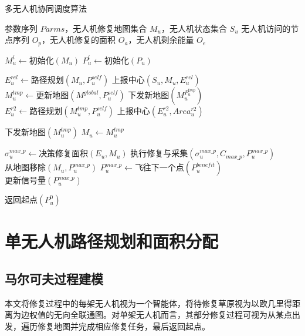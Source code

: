 \documentclass[AutoFakeBold]{LZUThesis}
\begin{document}
\begin{algorithm}[H]
	\caption{多无人机协同调度算法}
	\label{alg:multi_uav_scheduling}
	\begin{algorithmic}[1]
		\Require 参数序列 $Parms$，无人机修复地图集合 $M_u$，无人机状态集合 $S_u$
		\Ensure 无人机访问的节点序列 $O_p$，无人机修复的面积 $O_a$，无人机剩余能量 $O_e$

		\State $M_u^i \gets \text{初始化}(M_u)$ 
		\State $P_u^i \gets \text{初始化}(P_u)$ 

		\State $E_u^{rel} \gets \text{路径规划}(M_u, P_u^{self})$ 
		\State $\text{上报中心}(S_u, M_u, E_u^{rel})$ 
		\State $M_u^{tmp} \gets \text{更新地图}(M^{global}, P_u^{self})$ 
		\State $\text{下发新地图}(M_u^{P_u^{tmp}})$ 
		\State $E_u^{r2} \gets \text{路径规划}(M_u^{tmp}, P_u^{self})$ 
		\State $\text{上报中心}(E_u^{r2}, Area_u^{r2})$ 

		\State $\text{下发新地图}(M_u^{tmp})$ 
		\State $M_u \gets M_u^{tmp}$
		\EndIf

		\State $\sigma_u^{max\_p} \gets \text{决策修复面积}(E_u, M_u)$ 
		\State $\text{执行修复与采集}(\sigma_u^{max\_p}, C_{max\_p}, P_u^{max\_p})$ 
		\State $\text{从地图移除}(M_u, P_u^{max\_p})$
		\State $P_u^{max\_p} \gets \text{飞往下一个点}(P_u^{benefit})$ 
		\State $\text{更新信号量}(P_u^{max\_p})$ 
		\EndWhile

		\State $\text{返回起点}(P_u^0)$ 
	\end{algorithmic}
\end{algorithm}


\section{单无人机路径规划和面积分配}

\subsection{马尔可夫过程建模}
本文将修复过程中的每架无人机视为一个智能体，将待修复草原视为以欧几里得距离为边权值的无向全联通图。对单架无人机而言，其部分修复过程可视为从某点出发，遍历修复地图并完成相应修复任务，最后返回起点。
\end{document}
